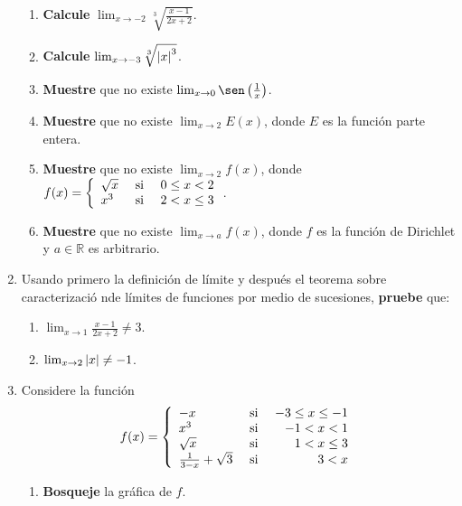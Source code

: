 \documentclass[12pt]{article}
\begin{document}
\begin{enumerate}
\begin{enumerate}
        \item \textbf{Calcule} $\lim_{x\rightarrow-2}\sqrt[3]{\frac{x-1}{2x+2}}$.
        \item \textbf{Calcule} $\lim_{x\rightarrow-3}\sqrt[3]{\left| x \right|^3}$.
        \item \textbf{Muestre} que no existe $\lim_{x\rightarrow0}\sen\left(\frac{1}{x}\right)$.
        \item \textbf{Muestre} que no existe $\lim_{x\rightarrow2}E(x)$, donde $E$ es la función parte entera.
        \item \textbf{Muestre} que no existe $\lim_{x\rightarrow2}f(x)$, donde $f(x)=\left\{\begin{array}{lcr}
            \sqrt{x} & \textup{ si } & 0\leq x<2\\
            x^3 & \textup{ si } & 2<x\leq3 \\
        \end{array} \right.$.
        \item \textbf{Muestre} que no existe $\lim_{x\rightarrow a}f(x)$, donde $f$ es la función de Dirichlet y $a\in\mathbb{R}$ es arbitrario.
    \end{enumerate}
    \item Usando primero la definición de límite y después el teorema sobre caracterizació nde límites de funciones por medio de sucesiones, \textbf{pruebe} que:
    \begin{enumerate}
        \item $\lim_{x\rightarrow1}\frac{x-1}{2x+2}\neq 3$.
        \item $\lim_{x\rightarrow 2}\left| x \right|\neq -1$.
    \end{enumerate}
    \item Considere la función
    \begin{equation*}
        f(x)=\left\{
            \begin{array}{lcr}
                -x & \textup{ si } & -3\leq x\leq-1\\
                x^3 & \textup{ si } & -1< x<1\\
                \sqrt{x} & \textup{ si } & 1<x\leq3 \\
                \frac{1}{3-x}+\sqrt{3} & \textup{ si } & 3<x\\ 
            \end{array}
        \right.
    \end{equation*}
    \begin{enumerate}
        \item \textbf{Bosqueje} la gráfica de $f$.

\end{enumerate}
\end{enumerate}
\end{document}
